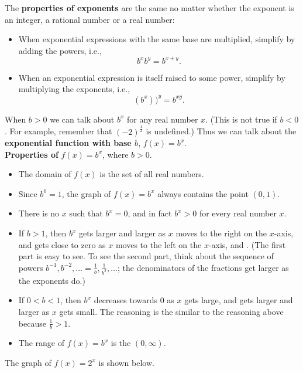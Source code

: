 \documentclass[11pt]{book}               %
\begin{document}
The \textbf{properties of exponents} are the same no matter whether the exponent is an integer, a rational number or a real number:
\begin{itemize}
\item When exponential expressions with the same base are multiplied, simplify by adding the powers, i.e.,
$$b^xb^y = b^{x+y}.$$
\item When an exponential expression is itself raised to some power, simplify by multiplying the exponents, i.e., 
$$\left(b^x\right))^y = b^{xy}.$$
\end{itemize}

When $b > 0$ we can talk about $b^x$ for any real number $x$.  (This is not true if $b < 0$. For example, remember that $(-2)^{\frac{1}{2}}$ is undefined.)
Thus we can talk about the \textbf{exponential function with base $b$},  $f(x) = b^x$.\\


\noindent
\textbf{Properties of} $f(x)=b^x$, where $b>0$.
\begin{itemize}
\item The domain of $f(x)$ is the set of all real numbers.
\item Since $b^0 = 1$, the graph of $f(x)=b^x$ always contains the point $(0, 1)$.
\item There is no $x$ such that $b^x = 0$, and in fact $b^x > 0$ for every real number $x$.
\item If $b > 1$, then $b^x$ gets larger and larger as $x$ moves to the right on the $x$-axis, and
gets close to zero as $x$ moves to the left on the $x$-axis, and .  (The first part is easy to see.  To see the second part, think about the sequence of powers $b^{-1}, b^{-2}, \ldots = \frac{1}{b}, \frac{1}{b^2}, \ldots$;  the denominators  of the fractions get larger as the exponents do.) 
\item If $0 < b < 1$, then $b^x$ decreases towards 0 
as $x$ gets large, and gets larger and larger as $x$ gets small.  The reasoning is the similar
to the reasoning above because $\frac{1}{b} > 1$.
\item The range of $f(x) = b^x$ is the $(0, \infty)$.
\end{itemize}


The graph of $f(x) = 2^x$ is shown below.
\end{document}
